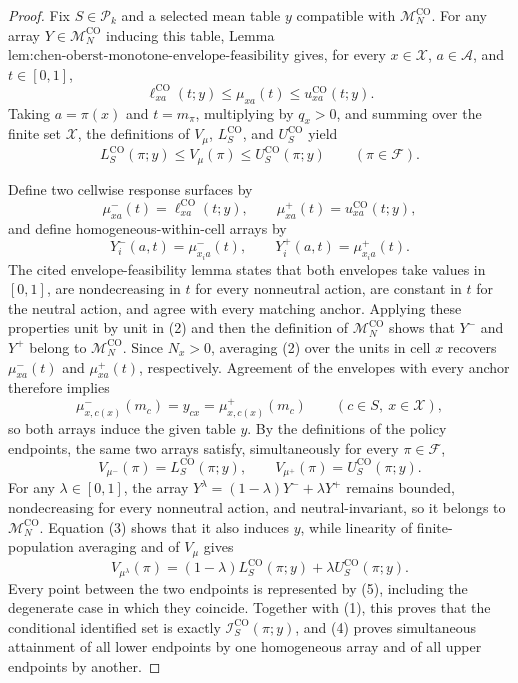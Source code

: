 \documentclass{article}
\begin{document}
\begin{proof}
Fix \(S\in\mathcal P_k\) and a selected mean table \(y\) compatible with \(\mathcal M_N^{\mathrm{CO}}\).  For any array \(Y\in\mathcal M_N^{\mathrm{CO}}\) inducing this table, Lemma \(\text{lem:chen-oberst-monotone-envelope-feasibility}\) gives, for every \(x\in\mathcal X\), \(a\in\mathcal A\), and \(t\in[0,1]\),
\[
\ell^{\mathrm{CO}}_{xa}(t;y)
\leq \mu_{xa}(t)
\leq u^{\mathrm{CO}}_{xa}(t;y).
\]
Taking \(a=\pi(x)\) and \(t=m_\pi\), multiplying by \(q_x>0\), and summing over the finite set \(\mathcal X\), the definitions of \(V_\mu\), \(L^{\mathrm{CO}}_S\), and \(U^{\mathrm{CO}}_S\) yield
\[
L^{\mathrm{CO}}_S(\pi;y)
\leq V_\mu(\pi)
\leq U^{\mathrm{CO}}_S(\pi;y)
\qquad(\pi\in\mathcal F).
\tag{1}
\]

Define two cellwise response surfaces by
\[
\mu^-_{xa}(t)=\ell^{\mathrm{CO}}_{xa}(t;y),
\qquad
\mu^+_{xa}(t)=u^{\mathrm{CO}}_{xa}(t;y),
\]
and define homogeneous-within-cell arrays by
\[
Y_i^-(a,t)=\mu^-_{x_i a}(t),
\qquad
Y_i^+(a,t)=\mu^+_{x_i a}(t).
\tag{2}
\]
The cited envelope-feasibility lemma states that both envelopes take values in \([0,1]\), are nondecreasing in \(t\) for every nonneutral action, are constant in \(t\) for the neutral action, and agree with every matching anchor.  Applying these properties unit by unit in (2) and then the definition of \(\mathcal M_N^{\mathrm{CO}}\) shows that \(Y^-\) and \(Y^+\) belong to \(\mathcal M_N^{\mathrm{CO}}\).  Since \(N_x>0\), averaging (2) over the units in cell \(x\) recovers \(\mu^-_{xa}(t)\) and \(\mu^+_{xa}(t)\), respectively.  Agreement of the envelopes with every anchor therefore implies
\[
\mu^-_{x,c(x)}(m_c)=y_{cx}
=\mu^+_{x,c(x)}(m_c)
\qquad(c\in S,\ x\in\mathcal X),
\tag{3}
\]
so both arrays induce the given table \(y\).  By the definitions of the policy endpoints, the same two arrays satisfy, simultaneously for every \(\pi\in\mathcal F\),
\[
V_{\mu^-}(\pi)=L^{\mathrm{CO}}_S(\pi;y),
\qquad
V_{\mu^+}(\pi)=U^{\mathrm{CO}}_S(\pi;y).
\tag{4}
\]
For any \(\lambda\in[0,1]\), the array \(Y^\lambda=(1-\lambda)Y^-+\lambda Y^+\) remains bounded, nondecreasing for every nonneutral action, and neutral-invariant, so it belongs to \(\mathcal M_N^{\mathrm{CO}}\).  Equation (3) shows that it also induces \(y\), while linearity of finite-population averaging and of \(V_\mu\) gives
\[
V_{\mu^\lambda}(\pi)
=(1-\lambda)L^{\mathrm{CO}}_S(\pi;y)
+\lambda U^{\mathrm{CO}}_S(\pi;y).
\tag{5}
\]
Every point between the two endpoints is represented by (5), including the degenerate case in which they coincide.  Together with (1), this proves that the conditional identified set is exactly \(\mathcal I^{\mathrm{CO}}_S(\pi;y)\), and (4) proves simultaneous attainment of all lower endpoints by one homogeneous array and of all upper endpoints by another.


\end{proof}
\end{document}
